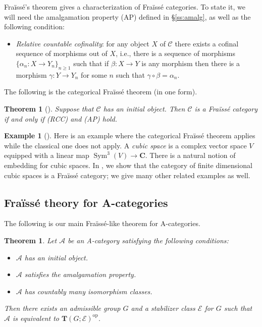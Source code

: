 \documentclass[12pt]{amsart}
\numberwithin{equation}{section}
\newtheorem{theorem}[equation]{Theorem}
\theoremstyle{definition}
\newtheorem{eg}[equation]{Example}
\newenvironment{example}[1][]{\begin{eg}[#1] \pushQED{\qed}}{\popQED \end{eg}}
\newcommand{\cA}{\mathcal{A}}
\newcommand{\rA}{\mathrm{A}}
\newcommand{\bC}{\mathbf{C}}
\newcommand{\cC}{\mathcal{C}}
\newcommand{\sE}{\mathscr{E}}
\newcommand{\bT}{\mathbf{T}}
\newcommand{\defn}[1]{\emph{#1}}
\DeclareMathOperator{\Sym}{Sym}
\newcommand{\op}{\mathrm{op}}
\begin{document}
Fra\"iss\'e's theorem gives a characterization of Fra\"iss\'e categories. To state it, we will need the amalgamation property (AP) defined in \S \ref{ss:amalg}, as well as the following condition:
\begin{itemize}[leftmargin=1.5cm]
\item[(RCC)] \defn{Relative countable cofinality}: for any object $X$ of $\cC$ there exists a cofinal sequence of morphisms out of $X$, i.e., there is a sequence of morphisms $\{\alpha_n \colon X \to Y_n \}_{n \ge 1}$ such that if $\beta \colon X \to Y$ is any morphism then there is a morphism $\gamma \colon Y \to Y_n$ for some $n$ such that $\gamma \circ \beta = \alpha_n$.
\end{itemize}
The following is the categorical Fra\"iss\'e theorem (in one form).

\begin{theorem}[{\cite[Theorem~A.11]{homoten}}] \label{thm:fraisse0}
Suppose that $\cC$ has an initial object. Then $\cC$ is a Fra\"iss\'e category if and only if (RCC) and (AP) hold.
\end{theorem}

\begin{example}
Here is an example where the categorical Fra\"iss\'e theorem applies while the classical one does not apply. A \defn{cubic space} is a complex vector space $V$ equipped with a linear map $\Sym^3(V) \to \bC$. There is a natural notion of embedding for cubic spaces. In \cite{homoten}, we show that the category of finite dimensional cubic spaces is a Fra\"iss\'e category; we give many other related examples as well.
\end{example}

\subsection{Fra\"iss\'e theory for A-categories}

The following is our main Fra\"iss\'e-like theorem for $\rA$-categories.

\begin{theorem} \label{thm:fraisseA-1}
Let $\cA$ be an A-category satisfying the following conditions:
\begin{itemize}
\item $\cA$ has an initial object.
\item $\cA$ satisfies the amalgamation property.
\item $\cA$ has countably many isomorphism classes.
\end{itemize}
Then there exists an admissible group $G$ and a stabilizer class $\sE$ for $G$ such that $\cA$ is equivalent to $\bT(G;\sE)^{\op}$.
\end{theorem}
\end{document}
